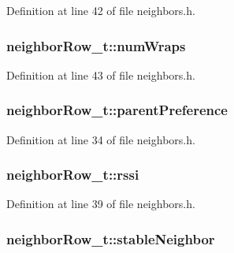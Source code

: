 Definition at line 42 of file neighbors.\+h.

\subsubsection[{\texorpdfstring{num\+Wraps}{numWraps}}]{ neighbor\+Row\+\_\+t\+::num\+Wraps}\hypertarget{structneighbor_row__t_ac1a1d7e09465447680f7243202c3430b}{}\label{structneighbor_row__t_ac1a1d7e09465447680f7243202c3430b}


Definition at line 43 of file neighbors.\+h.

\subsubsection[{\texorpdfstring{parent\+Preference}{parentPreference}}]{ neighbor\+Row\+\_\+t\+::parent\+Preference}\hypertarget{structneighbor_row__t_a70846bebfcf4c7fa48be949dd09dc267}{}\label{structneighbor_row__t_a70846bebfcf4c7fa48be949dd09dc267}


Definition at line 34 of file neighbors.\+h.

\subsubsection[{\texorpdfstring{rssi}{rssi}}]{ neighbor\+Row\+\_\+t\+::rssi}\hypertarget{structneighbor_row__t_a28b7a03233c1e2514325e44abe51a0e6}{}\label{structneighbor_row__t_a28b7a03233c1e2514325e44abe51a0e6}


Definition at line 39 of file neighbors.\+h.

\subsubsection[{\texorpdfstring{stable\+Neighbor}{stableNeighbor}}]{ neighbor\+Row\+\_\+t\+::stable\+Neighbor}\hypertarget{structneighbor_row__t_ae1bc269fa782bead16bae4b97370efd3}{}\label{structneighbor_row__t_ae1bc269fa782bead16bae4b97370efd3}


